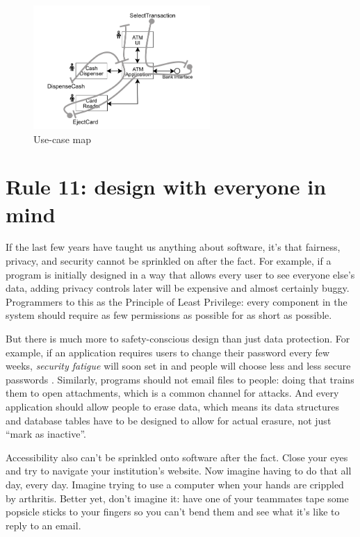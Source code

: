\documentclass[10pt,letterpaper]{article}
\begin{document}
\begin{figure}
  \centering
  \includegraphics[width=0.6\textwidth]{use-case-map.png}
  \caption{Use-case map}
  \label{use-case-map}
\end{figure}

\section*{Rule 11: design with everyone in mind}

If the last few years have taught us anything about software,
it's that fairness, privacy, and security cannot be sprinkled on after the fact.
For example,
if a program is initially designed in a way that allows every user to see everyone else's data,
adding privacy controls later will be expensive and almost certainly buggy.
Programmers to this as the Principle of Least Privilege:
every component in the system should require as few permissions as possible
for as short as possible.

But there is much more to safety-conscious design than just data protection.
For example,
if an application requires users to change their password every few weeks,
\emph{security fatigue} will soon set in
and people will choose less and less secure passwords \cite{Smalls2021}.
Similarly,
programs should not email files to people:
doing that trains them to open attachments,
which is a common channel for attacks.
And every application should allow people to erase data,
which means its data structures and database tables have to be designed to allow for actual erasure,
not just ``mark as inactive''.

Accessibility also can't be sprinkled onto software after the fact.
Close your eyes and try to navigate your institution's website.
Now imagine having to do that all day, every day.
Imagine trying to use a computer when your hands are crippled by arthritis.
Better yet, don't imagine it:
have one of your teammates tape some popsicle sticks to your fingers so you can't bend them
and see what it's like to reply to an email.
\end{document}
